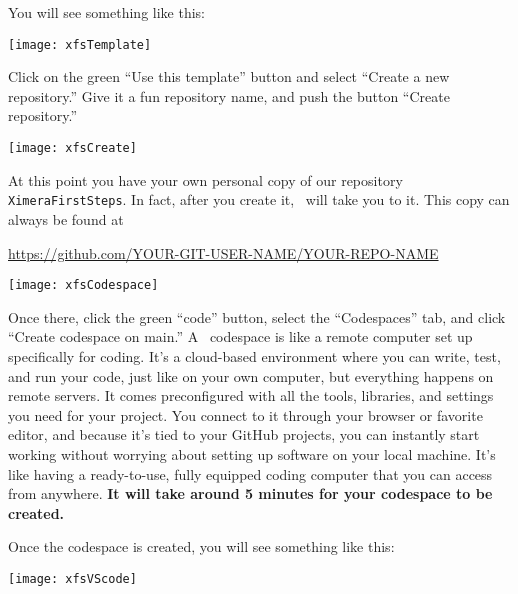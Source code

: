 \documentclass{ximera}
\begin{document}
        You will see something like this:
        \pdfOnly{\end{multicols}}
\begin{image}
    \texttt{[image: xfsTemplate]}
\end{image}
\newpage
        Click on the green ``Use this template'' button and select ``Create a
        new repository.'' Give it a fun repository name, and push the button
        ``Create repository.'' 
\begin{image}
    \texttt{[image: xfsCreate]}
\end{image}
At this point you have your own personal copy of our repository \verb!XimeraFirstSteps!. 
In fact, after you create it, \github\ will take you to it. This copy can always be found at
\begin{center}
    \url{https://github.com/YOUR-GIT-USER-NAME/YOUR-REPO-NAME}
\end{center}
\newpage
\begin{image}
    \texttt{[image: xfsCodespace]}
\end{image}
    Once there, click the green ``code'' button, select
        the ``Codespaces'' tab, and click ``Create codespace on main.''
        A \github\ codespace is like a remote computer set up specifically for coding.
        It's a cloud-based environment where you can write, test, and run your code,
        just like on your own computer, but everything happens on remote servers. It
        comes preconfigured with all the tools, libraries, and settings you need for
        your project. You connect to it through your browser or favorite editor, and
        because it's tied to your GitHub projects, you can instantly start working
        without worrying about setting up software on your local machine. It's like
        having a ready-to-use, fully equipped coding computer that you can access from
        anywhere. \textbf{It will take around 5 minutes for your codespace to be
            created.}

\newpage

Once the codespace is created, you will see something like this:
\begin{image}
    \texttt{[image: xfsVScode]}
\end{image}
\end{document}
